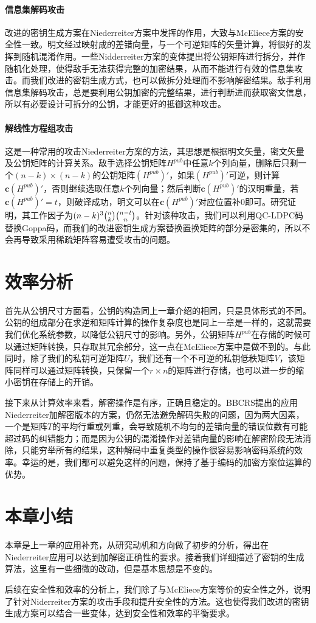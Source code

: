 \paragraph{信息集解码攻击}
改进的密钥生成方案在Niederreiter方案中发挥的作用，大致与McEliece方案的安全性一致。明文经过映射成的差错向量，与一个可逆矩阵的矢量计算，将很好的发挥到随机混淆作用。一些Nidderreiter方案的变体提出将公钥矩阵进行拆分，并作随机化处理，使得敌手无法获得完整的加密结果，从而不能进行有效的信息集攻击。而我们改进的密钥生成方式，也可以做拆分处理而不影响解密结果。敌手利用信息集解码攻击，总是要利用公钥加密的完整结果，进行判断进而获取密文信息，所以有必要设计可拆分的公钥，才能更好的抵御这种攻击。

\paragraph{解线性方程组攻击}
这是一种常用的攻击Niederreiter方案的方法，其思想是根据明文矢量，密文矢量及公钥矩阵的计算关系。敌手选择公钥矩阵$H^{pub}$中任意$k$个列向量，删除后只剩一个$(n - k) \times (n - k)$的公钥矩阵$(H^{pub})'$，如果$(H^{pub})'$可逆，则计算$\mathbf{c}(H^{pub})'$，否则继续选取任意$k$个列向量；然后判断$\mathbf{c}(H^{pub})'$的汉明重量，若$\mathbf{c}(H^{pub})' = t$，则破译成功，明文可以在$\mathbf{c}(H^{pub})'$对应位置补$0$即可。研究证明，其工作因子为$(n - k) ^ 3 \tbinom{n}{k} \tbinom{n - t}{n}$。针对该种攻击，我们可以利用QC-LDPC码替换Goppa码，而我们的改进密钥生成方案替换置换矩阵的部分是密集的，所以不会再导致采用稀疏矩阵容易遭受攻击的问题。

\section{效率分析}
首先从公钥尺寸方面看，公钥的构造同上一章介绍的相同，只是具体形式的不同。公钥的组成部分在求逆和矩阵计算的操作复杂度也是同上一章是一样的，这就需要我们优化系统参数，以降低公钥尺寸的影响。另外，公钥矩阵$H^{pub}$在存储的时候可以通过矩阵转换，只存取其冗余部分，这一点在McEliece方案中是做不到的。与此同时，除了我们的私钥可逆矩阵$U$，我们还有一个不可逆的私钥低秩矩阵$V$，该矩阵同样可以通过矩阵转换，只保留一个$r \times n$的矩阵进行存储，也可以进一步的缩小密钥在存储上的开销。

接下来从计算效率来看，解密操作是有序，正确且稳定的。BBCRS提出的应用Niederreiter加解密版本的方案，仍然无法避免解码失败的问题，因为两大因素，一个是矩阵$T$的平均行重或列重，会导致随机不均匀的差错向量的错误位数有可能超过码的纠错能力；而是因为公钥的混淆操作对差错向量的影响在解密阶段无法消除，只能穷举所有的结果，这种解码中重复类型的操作很容易影响密码系统的效率。幸运的是，我们都可以避免这样的问题，保持了基于编码的加密方案位运算的优势。

\section{本章小结}
本章是上一章的应用补充，从研究动机和方向做了初步的分析，得出在Niederreiter应用可以达到加解密正确性的要求。接着我们详细描述了密钥的生成算法，这里有一些细微的改动，但是基本思想是不变的。

后续在安全性和效率的分析上，我们除了与McEliece方案等价的安全性之外，说明了针对Niderreiter方案的攻击手段和提升安全性的方法。这也使得我们改进的密钥生成方案可以结合一些变体，达到安全性和效率的平衡要求。
